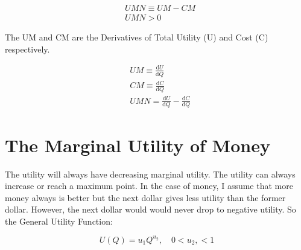 \documentclass[12pt,letterpaper]{article}
\begin{document}
		\begin{align*}
			&UMN \equiv UM-CM \\
			&UMN > 0
		\end{align*}

		The UM and CM are the Derivatives of Total Utility (U) and Cost (C) respectively.

		\begin{align*}
			&UM \equiv \frac{\mathrm{d}U}{\mathrm{d}Q} \\
			&CM \equiv \frac{\mathrm{d}C}{\mathrm{d}Q} \\
			&UMN = \frac{\mathrm{d}U}{\mathrm{d}Q} - \frac{\mathrm{d}C}{\mathrm{d}Q}
		\end{align*}

		\section{The Marginal Utility of Money}

		The utility will always have decreasing marginal utility. The utility can always increase or reach a maximum point. In the case of money, I assume that more money always is better but the next dollar gives less utility than the former dollar. However, the next dollar would would never drop to negative utility. So the General Utility Function:

		\begin{equation}
			U(Q) = u_1 Q^{u_2}, \quad 0<u_2,<1
		\end{equation}


\end{document}
